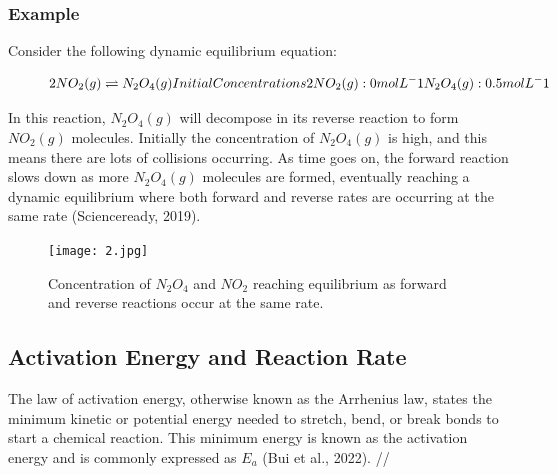 \subsubsection{Example}
Consider the following dynamic equilibrium equation: 

\begin{figure}[htp]
    \centering
    \[
        2NO_{2}(g) \rightleftharpoons N_{2}O_{4}(g) \\

	Initial Concentrations \\
	2NO_{2}(g) : 0 mol L^-1	\\ N_{2}O_{4}(g) : 0.5 mol L^-1
    \]
    \caption{}
    \label{fig:enter-label}
\end{figure}

In this reaction, \begin{math}N_{2}O_{4}(g)\end{math} will decompose in its reverse reaction to form \begin{math}NO_{2}(g)\end{math} molecules. Initially the concentration of \begin{math}N_{2}O_{4}(g)\end{math} is high, and this means there are lots of collisions occurring. As time goes on, the forward reaction slows down as more \begin{math}N_{2}O_{4}(g)\end{math} molecules are formed, eventually reaching a dynamic equilibrium where both forward and reverse rates are occurring at the same rate (Scienceready, 2019).

\begin{figure}
    \centering
    \texttt{[image: 2.jpg]}
    \caption{Concentration of \begin{math}N_{2}O_{4}\end{math} and \begin{math} NO_{2}\end{math} reaching equilibrium as forward and reverse reactions occur at the same rate.}
    \label{fig:enter-label}
\end{figure}

\subsection{Activation Energy and Reaction Rate}
The law of activation energy, otherwise known as the Arrhenius law, states the minimum kinetic or potential energy needed to stretch, bend, or break bonds to start a chemical reaction. This minimum energy is known as the activation energy and is commonly expressed as \begin{math}E_{a}\end{math} (Bui et al., 2022). //


